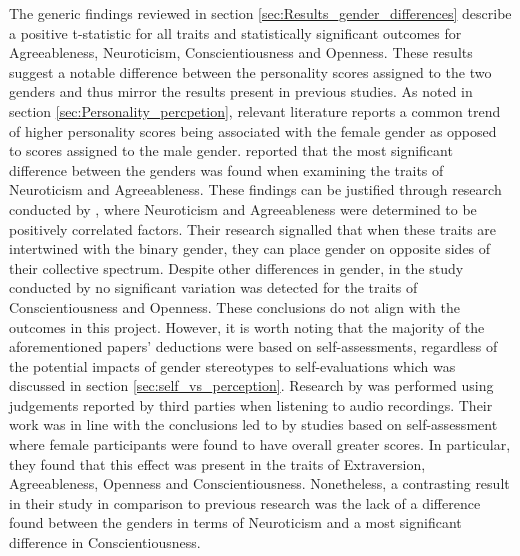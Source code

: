 \documentclass{l4proj}
\begin{document}
The generic findings reviewed in section \ref{sec:Results_gender_differences} describe a positive t-statistic for all traits and statistically significant outcomes for Agreeableness, Neuroticism, Conscientiousness and Openness. These results suggest a notable difference between the personality scores assigned to the two genders and thus mirror the results present in previous studies. As noted in section \ref{sec:Personality_percpetion}, relevant literature reports a common trend of higher personality scores being associated with the female gender as opposed to scores assigned to the male gender. \citet{Weisberg2011} reported that the most significant difference between the genders was found when examining the traits of Neuroticism and Agreeableness. These findings can be justified through research conducted by \citet{budaev1999sex}, where Neuroticism and Agreeableness were determined to be positively correlated factors. Their research signalled that when these traits are intertwined with the binary gender, they can place gender on opposite sides of their collective spectrum.
Despite other differences in gender, in the study conducted by \citet{Weisberg2011} no significant variation was detected for the traits of Conscientiousness and Openness. These conclusions do not align with the outcomes in this project. 
However, it is worth noting that the majority of the aforementioned papers’ deductions were based on self-assessments, regardless of the potential impacts of gender stereotypes to self-evaluations which was discussed in section \ref{sec:self_vs_perception}. Research by \citet{Dennhag2019} was performed using judgements reported by third parties when listening to audio recordings. Their work was in line with the conclusions led to by studies based on self-assessment where female participants were found to have overall greater scores. In particular, they found that this effect was present in the traits of Extraversion, Agreeableness, Openness and Conscientiousness. Nonetheless, a contrasting result in their study in comparison to previous research was the lack of a difference found between the genders in terms of Neuroticism and a most significant difference in Conscientiousness. 
\end{document}

